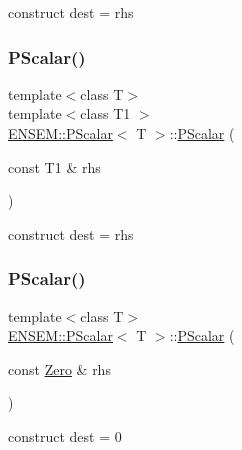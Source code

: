 construct dest = rhs 

\mbox{\label{classENSEM_1_1PScalar_a99cdd295d67d2d32aa481a4a8d9dcc1b}} 
\subsubsection{\texorpdfstring{PScalar()}{PScalar()}\hspace{0.1cm}{\footnotesize\ttfamily [16/18]}}
{\footnotesize\ttfamily template$<$class T$>$ \\
template$<$class T1 $>$ \\
\mbox{\hyperlink{classENSEM_1_1PScalar}{E\+N\+S\+E\+M\+::\+P\+Scalar}}$<$ T $>$\+::\mbox{\hyperlink{classENSEM_1_1PScalar}{P\+Scalar}} (\begin{DoxyParamCaption}\item[{const T1 \&}]{rhs }\end{DoxyParamCaption})\hspace{0.3cm}{\ttfamily [inline]}}



construct dest = rhs 

\mbox{\label{classENSEM_1_1PScalar_a9d7f56a0caeb05ee423b451d2f3aae3b}} 
\subsubsection{\texorpdfstring{PScalar()}{PScalar()}\hspace{0.1cm}{\footnotesize\ttfamily [17/18]}}
{\footnotesize\ttfamily template$<$class T$>$ \\
\mbox{\hyperlink{classENSEM_1_1PScalar}{E\+N\+S\+E\+M\+::\+P\+Scalar}}$<$ T $>$\+::\mbox{\hyperlink{classENSEM_1_1PScalar}{P\+Scalar}} (\begin{DoxyParamCaption}\item[{const \mbox{\hyperlink{structENSEM_1_1Zero}{Zero}} \&}]{rhs }\end{DoxyParamCaption})\hspace{0.3cm}{\ttfamily [inline]}}



construct dest = 0 

